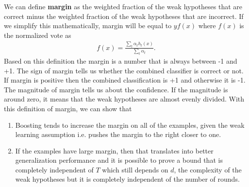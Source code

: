\documentclass[10pt ]{article}
\begin{document}
We can define \textbf{margin} as the weighted fraction of the weak hypotheses that are correct minus the  weighted fraction of the weak hypotheses that are incorrect. If we simplify this mathematically, margin will be equal to  $y f(x)$ where $f(x)$ is the normalized vote as 
\begin{align}
f(x) =\frac{\sum_t \alpha_t h_t(x)}{\sum_t \alpha_t}.
\end{align}
Based on this definition the margin is a number that is always between -1 and +1. The sign of margin tells us whether the combined classifier is correct or not. If margin is positive then the combined classification is +1 and otherwise it is -1. The magnitude  of margin tells us about the confidence. If the magnitude is around zero, it means that the weak hypotheses are almost evenly divided. With this definition of margin, we can show that
\begin{enumerate}
\item Boosting tends to increase the margin on all of the examples, given the weak learning assumption i.e. pushes the margin to the right closer to one. 
\item If the examples have large margin, then that translates into better generalization performance and it is possible to prove a bound that is completely independent of $T$ which still depends on $d$, the complexity of the weak hypotheses but it is completely independent of the number of rounds.
\end{enumerate}


\end{document}
